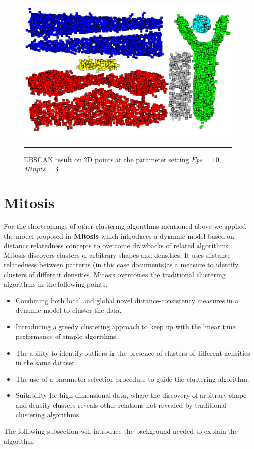 \begin{figure}[htbp]
	\centering
		\includegraphics{./Figures/DBSCAN_2.png}
		\rule{25em}{0.3pt}
	\caption[DBSCAN result on 2D points at the parameter setting $Eps = 10$, $Minpts = 3$]{DBSCAN result on 2D points at the parameter setting $Eps = 10$, $Minpts = 3$}
	\label{fig:DBSCNA_2}
\end{figure}

\section{Mitosis}\label{mitosis}
For the shortcomings of other clustering algorithms mentioned above we applied the model proposed in \textbf{Mitosis} \citep{Mitosis_1} which introduces a dynamic model based on distance relatedness concepts to overcome drawbacks of related algorithms. Mitosis discovers clusters of arbitrary shapes and densities. It uses distance relatedness between patterns (in this case documents)as a measure to identify clusters of different densities.
Mitosis overcomes the traditional clustering algorithms in the following points.
\begin{itemize}
\item{Combining both local and global novel distance-consistency measures in a dynamic model to cluster the data.}
\item{Introducing a greedy clustering approach to keep up with the linear time performance of simple algorithms.}
\item{The ability to identify outliers in the presence of clusters of different densities in the same dataset.}
\item{The use of a parameter selection procedure to guide the clustering algorithm.}
\item{Suitability for high dimensional data, where the discovery of arbitrary shape and density clusters reveals other relations not revealed by traditional clustering algorithms.}
\end{itemize}
The following subsection will introduce the background needed to explain the algorithm.
